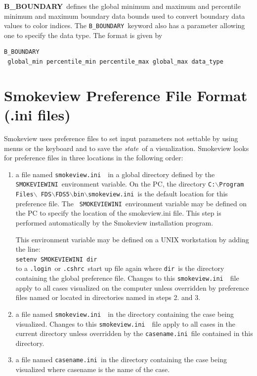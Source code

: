 \documentclass[11pt,twoside]{book}
\newcommand{\svini}{{\tt smokeview.ini}\ }
\begin{document}
{\bf B\_BOUNDARY}\ defines the global minimum and maximum and percentile minimum and
maximum boundary
data bounds used to convert boundary data values to color indices.
The {\tt B\_BOUNDARY}\ keyword also has a parameter allowing
one to specify the data type.  The format is given by
\begin{lstlisting}
B_BOUNDARY
 global_min percentile_min percentile_max global_max data_type
\end{lstlisting}



\section{Smokeview Preference File Format (.ini files)}
\label{sectionconfig}
\label{appendixini}

Smokeview uses preference files to set input parameters not
settable by using menus or the keyboard and to save the {\em
state}\ of a visualization. Smokeview looks for preference files
in three locations in the following order:
\begin{enumerate}

\item a file named \svini\ in a global directory defined by the
{\tt SMOKEVIEWINI}\ environment variable. On the PC, the directory
{\tt C:$\backslash$Program Files$\backslash$
FDS$\backslash$FDS5$\backslash$bin$\backslash$smokeview.ini}\ is
the default location for this preference file. The {\tt
SMOKEVIEWINI}\ environment variable may be defined on the PC to
specify the location of the smokeview.ini file. This step is
performed automatically by the Smokeview installation program.

This environment variable may be
defined on a UNIX workstation by adding the line:\\

{\tt setenv SMOKEVIEWINI dir}\ \\

to a {\tt .login}\  or {\tt .cshrc}\ start up file
again where {\tt dir}\ is the directory containing the
global preference file. Changes to this \svini\
file apply to all cases visualized on the computer unless
overridden by preference files named or located in
directories named in steps 2. and  3.

\item a file named \svini\ in the directory
containing the case being visualized.  Changes to
this \svini\ file apply to all cases in the current
directory unless overridden by the {\tt casename.ini}\ file
contained in this directory.

\item a file named {\tt casename.ini}\ in the directory containing the case being
visualized where casename is the name of the case.
\end{enumerate}
\end{document}
